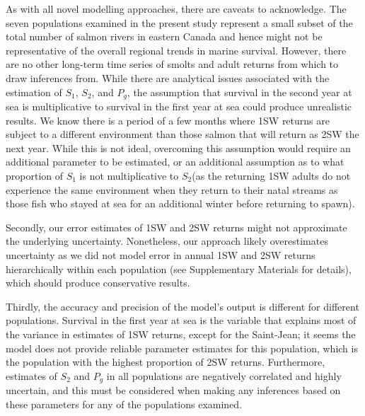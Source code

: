 \documentclass[12pt]{article}
\newcommand{\So}{$S_{1}$\xspace}
\newcommand{\St}{$S_{2}$\xspace}
\newcommand{\Pg}{$P_g$\xspace}
\begin{document}
As with all novel modelling approaches, there are caveats to acknowledge.
The seven populations examined in the present study represent a small subset of the total number of salmon rivers in eastern Canada and hence might not be representative
of the overall regional trends in marine survival. However, there are no other
long-term time series of smolts and adult returns from which to draw inferences from.
While there are analytical issues associated with the estimation of \So, \St, and \Pg,
the assumption that survival in the second year at sea is multiplicative to survival in the first
year at sea could produce unrealistic results.
We know there is a period of a few months where 1SW
returns are subject to a different environment than those salmon that will
return as 2SW the next year.
While this is not ideal,
overcoming this assumption would require an additional parameter to be
estimated, or an additional assumption as to what proportion of \So is not
multiplicative to \St (as the returning 1SW adults do not experience the same
environment when they return to their natal streams as those fish who stayed
at sea for an additional winter before returning to spawn).

Secondly, our error estimates of 1SW and 2SW returns might not approximate the
underlying uncertainty. Nonetheless, our approach likely overestimates
uncertainty as we did not model error in annual 1SW and 2SW returns
hierarchically within each population (see Supplementary Materials for
details), which should produce conservative results.


Thirdly, the accuracy and precision of the model's output is different
for different populations. Survival in the first year at sea is the variable
that explains most of the variance in estimates of 1SW returns, except for the
Saint-Jean; it seems
the model does not provide reliable parameter estimates for this population,
which is the population with the highest proportion of 2SW returns.
Furthermore, estimates of \St and \Pg in all populations are negatively correlated and highly
uncertain, and this must be considered when making any inferences based on
these parameters for any of the populations examined.
\end{document}
